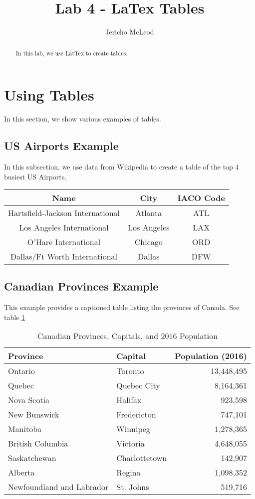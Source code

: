 \documentclass[11pt]{article}
\title{Lab 4 - LaTex Tables}
\author{Jericho McLeod}
\begin{document}
\maketitle

\begin{abstract}
In this lab, we use LatTex to create tables.
\end{abstract}

\section{Using Tables}
In this section, we show various examples of tables.

\subsection{US Airports Example}
In this subsection, we use data from Wikipedia to create a table of the top 4 busiest US Airports.


\begin{tabular}{|c|c|c|}
	\hline 
	Name & City & IACO Code \\ 
	\hline 
	Hartsfield-Jackson International & Atlanta & ATL \\ 
	\hline 
	Los Angeles International & Los Angeles & LAX \\ 
	\hline 
	O'Hare International & Chicago & ORD \\ 
	\hline 
	Dallas/Ft Worth International & Dallas & DFW \\ 
	\hline 
\end{tabular} 

\subsection{Canadian Provinces Example}
This example provides a captioned table listing the provinces of Canada.
See table \ref{tbl:CanProv}

\begin{table}[!th]
\begin{tabular}{|l|l|r|}
	\hline
	Province 			& Capital 			& Population (2016) \\
	\hline
	Ontario 			& Toronto 			& 13,448,495\\
	Quebec 				& Quebec City 	& 8,164,361\\
	Nova Scotia 	& Halifax 				& 923,598\\
	New Bunswick & Fredericton 		& 747,101\\
	Manitoba 			& Winnipeg 		& 1,278,365\\
	British Columbia & Victoria 		& 4,648,055\\
	Saskatchewan 	& Charlottetown & 142,907\\
	Alberta 			& Regina 				& 1,098,352\\
	Newfoundland and Labrador & St. Johns & 519,716\\
	\hline

	
	
\end{tabular}
\caption{Canadian Provinces, Capitals, and 2016 Population}
\label{tbl:CanProv}
\end{table}
\end{document}
